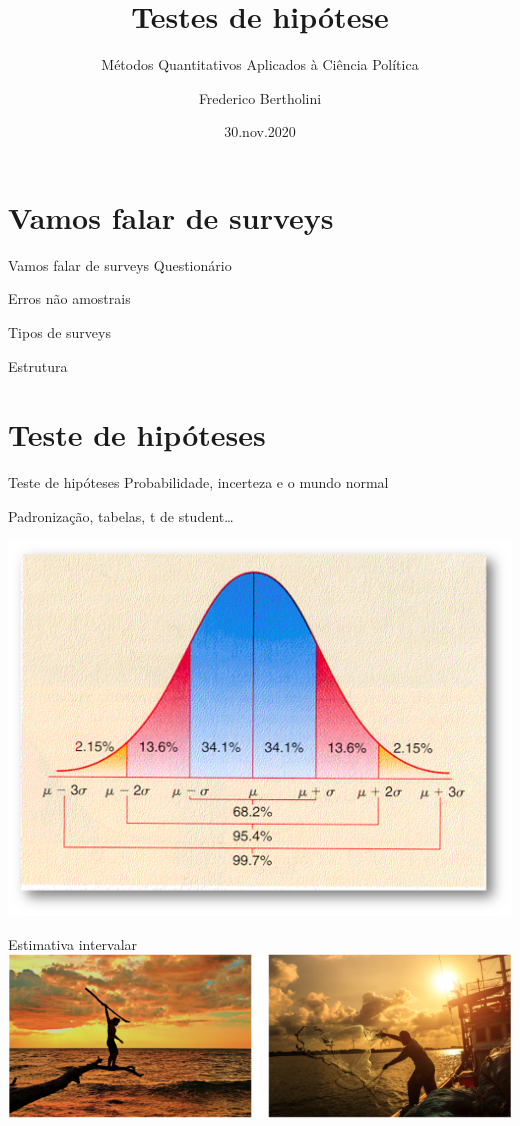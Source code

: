 \documentclass[
  9pt,
  ignorenonframetext,
  aspectratio=169]{beamer}
\title{Testes de hipótese}
\subtitle{Métodos Quantitativos Aplicados à Ciência Política}
\author{Frederico Bertholini}
\date{30.nov.2020}
\begin{document}
\frame{\titlepage}

\begin{frame}[allowframebreaks]
  \tableofcontents[hideallsubsections]
\end{frame}
\hypertarget{vamos-falar-de-surveys}{%
\section{Vamos falar de surveys}\label{vamos-falar-de-surveys}}

\begin{frame}{Vamos falar de surveys}
Questionário

Erros não amostrais

Tipos de surveys

Estrutura
\end{frame}

\hypertarget{teste-de-hipuxf3teses}{%
\section{Teste de hipóteses}\label{teste-de-hipuxf3teses}}

\begin{frame}{Teste de hipóteses}
Probabilidade, incerteza e o mundo normal

Padronização, tabelas, t de student\ldots{}

\includegraphics{imgs/normal_percent.png}
\end{frame}

\begin{frame}{Estimativa intervalar}
\protect\hypertarget{estimativa-intervalar}{}
\includegraphics{imgs/point_interval.png}
\end{frame}
\end{document}
